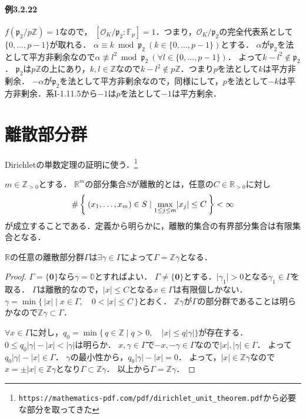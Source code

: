 \paragraph{例3.2.22}
$f(\mathfrak{p}_2/p\mathbb{Z})=1$なので，
$[\mathcal{O}_K/\mathfrak{p}_2:\mathbb{F}_p]=1$．つまり，$\mathcal{O}_K/\mathfrak{p}_2$の完全代表系として$\{0,\ldots,p-1\}$が取れる．
$\alpha\equiv k\bmod\mathfrak{p}_2\ (k\in\{0,\ldots,p-1\})$とする．
$\alpha$が$\mathfrak{p}_2$を法として平方非剰余なので$\alpha\not\equiv l^2\bmod\mathfrak{p}_2 ~ (\forall l\in\{0,\ldots,p-1\})$．
よって$k-l^2\not\in\mathfrak{p}_2$．
$\mathfrak{p}_2$は$p\mathbb{Z}$の上にあり，$k,l\in\mathbb{Z}$なので$k-l^2\not\in p\mathbb{Z}$．つまり$p$を法として$k$は平方非剰余．
$-\alpha$が$\mathfrak{p}_2$を法として平方非剰余なので，同様にして，$p$を法として$-k$は平方非剰余．系I-1.11.5から$-1$は$p$を法として$-1$は平方剰余．

\section*{離散部分群}
Dirichletの単数定理の証明に使う．\footnote{\verb|https://mathematics-pdf.com/pdf/dirichlet_unit_theorem.pdf|から必要な部分を取ってきた}

\begin{dfn}
  $m\in\mathbb{Z}_{>0}$とする．
  $\mathbb{R}^m$の部分集合$S$が離散的とは，任意の$C\in\mathbb{R}_{>0}$に対し
  \[\#\Set{(x_1,\ldots,x_m)\in S\mid\max_{1\leq j\leq m}\lvert x_j\rvert\leq C}<\infty\]
  が成立することである．定義から明らかに，離散的集合の有界部分集合は有限集合となる．
\end{dfn}

\begin{screen}
  \begin{lem}
    \label{discrete_subgroup_lemma_1}
    $\mathbb{R}$の任意の離散部分群$\Gamma$は$\exists\gamma\in\Gamma$によって$\Gamma=\mathbb{Z}\gamma$となる．
  \end{lem}
\end{screen}
\begin{proof}
  $\Gamma=\{\boldsymbol{0}\}$なら$\gamma=\mathbb{0}$とすればよい．
  $\Gamma\neq\{\boldsymbol{0}\}$とする．$\lvert\gamma_1\rvert>0$となる$\gamma_1\in\Gamma$を取る．
  $\Gamma$は離散的なので，$\lvert x\rvert\leq C$となる$x\in\Gamma$は有限個しかない．
  $\gamma=\min\{\,\lvert x\rvert\mid x\in\Gamma,\quad 0<\lvert x\rvert\leq C\,\}$とおく．
  $\mathbb{Z}\gamma$が$\Gamma$の部分群であることは明らかなので$\mathbb{Z}\gamma\subset\Gamma$．

  $\forall x\in\Gamma$に対し，$q_0=\min\{\,q\in\mathbb{Z}\mid q>0,\quad\lvert x\rvert\leq q\lvert\gamma\rvert\}$が存在する．
  $0\leq q_0\lvert\gamma\rvert-\lvert x\rvert<\lvert\gamma\rvert$は明らか．
  $x,\gamma\in\Gamma$で$-x,-\gamma\in\Gamma$なので$\lvert x\rvert,\lvert\gamma\rvert\in\Gamma$．
  よって$q_0\lvert\gamma\rvert-\lvert x\rvert\in\Gamma$．
  $\gamma$の最小性から，$q_0\lvert\gamma\rvert-\lvert x\rvert=0$．
  よって，$\lvert x\rvert\in\mathbb{Z}\gamma$なので$x=\pm\lvert x\rvert\in\mathbb{Z}\gamma$となり$\Gamma\subset\mathbb{Z}\gamma$．
  以上から$\Gamma=\mathbb{Z}\gamma$．
\end{proof}

